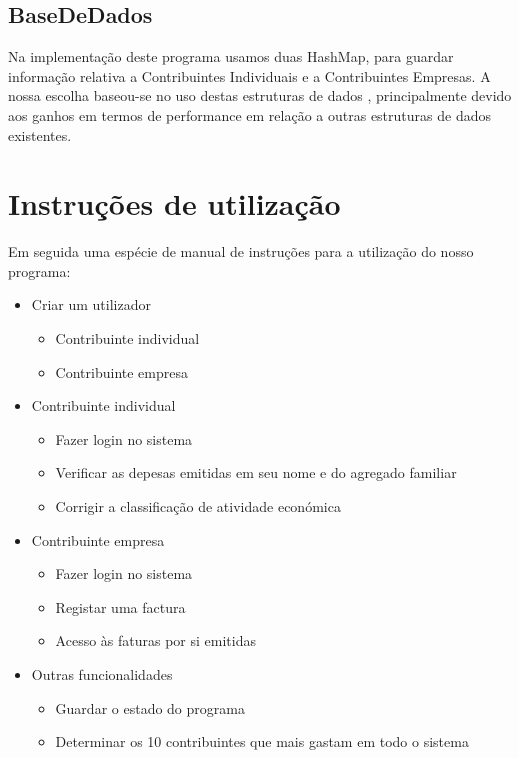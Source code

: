 \documentclass[a4paper]{article}
\begin{document}
\subsection{BaseDeDados}
Na implementação deste programa usamos duas HashMap, para guardar informação relativa a Contribuintes Individuais e a Contribuintes Empresas. A nossa escolha baseou-se no uso destas estruturas de dados , principalmente devido aos ganhos em termos de performance em relação a outras estruturas de dados existentes. 

\section{Instruções de utilização}
\label{sec:instrucoes}
Em seguida uma espécie de manual de instruções para a utilização do nosso programa:

	\begin{itemize}
		\item{Criar um utilizador}
			\begin{itemize}
				\item{Contribuinte individual}
				\item{Contribuinte empresa}
			\end{itemize}
		\item{Contribuinte individual}
			\begin{itemize}
				\item{Fazer login no sistema}
				\item{Verificar as depesas emitidas em seu nome e do agregado familiar}
				\item{Corrigir a classificação de atividade económica}
			\end{itemize}
		\item{Contribuinte empresa}
			\begin{itemize}
				\item{Fazer login no sistema}

				\item{Registar uma factura}
				\item{Acesso às faturas por si emitidas}
			\end{itemize}
		\item{Outras funcionalidades}
			\begin{itemize}
				\item{Guardar o estado do programa}
				\item{Determinar os 10 contribuintes que mais gastam em todo o sistema}
			\end{itemize}
	\end{itemize}
\end{document}
